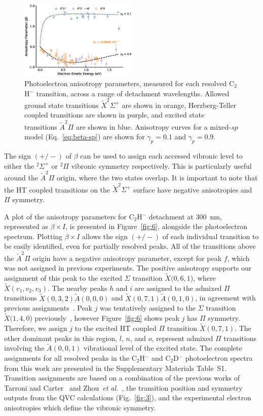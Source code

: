 \documentclass[aip,graphicx]{revtex4-1}
\begin{document}
\begin{figure}[th!]
	\includegraphics[width=0.5\textwidth]{figures/Fig5}
	\caption{Photoelectron anisotropy parameters, measured for each resolved C$_2$H$^-$ transition, across a range of detachment wavelengths. Allowed ground state transitions $\tilde{X}^2\Sigma^+$ are shown in orange, Herzberg-Teller coupled transitions are shown in purple, and excited state transitions $\tilde{A} ^2\Pi$ are shown in blue. Anisotropy curves for a mixed-$sp$ model (Eq.~\ref{eq:beta-sp}) are shown for $\gamma_p=0.1$ and $\gamma_p=0.9$.}
	\label{fig:5}
\end{figure}

The sign $(+/-)$ of $\beta$ can be used to assign each accessed vibronic level to either the $^2\Sigma^+$ or $^2\Pi$ vibronic symmetry respectively. This is particularly useful around the $\tilde{A} ^2\Pi$ origin, where the two states overlap. It is important to note that the HT coupled transitions on the $\tilde{X} ^2\Sigma^+$ surface have negative anisotropies and $\Pi$ symmetry. 

A plot of the anisotropy parameters for C$_2$H$^-$ detachment at 300~nm, represented as $\beta\times I$, is presented in Figure~\ref{fig:6}, alongside the photoelectron spectrum. Plotting $\beta\times I$ allows the sign $(+/-)$ of each individual transition to be easily identified, even for partially resolved peaks. All of the transitions above the $\tilde{A} ^2\Pi$ origin have a negative anisotropy parameter, except for peak $f$, which was not assigned in previous experiments. The positive anisotropy supports our assignment of this peak to the excited $\Sigma$ transition $\tilde{X}(0,6,1$), where $\tilde{X}(v_1,v_2,v_3)$. The nearby peaks $h$ and $i$  are assigned to the admixed $\Pi$ transitions $\tilde{X}(0,3,2)\tilde{A}(0,0,0)$ and $\tilde{X}(0,7,1)\tilde{A}(0,1,0)$, in agreement with previous assignments~\cite{zho07,tar03}. Peak $j$ was tentatively assigned to the $\Sigma$ transition $\tilde{X}(1,4,0$) previously~\cite{zho07}, however Figure~\ref{fig:6} shows peak $j$ has $\Pi$ symmetry. Therefore, we assign $j$ to the excited HT coupled $\Pi$ transition $\tilde{X}(0,7,1)$. The other dominant peaks in this region, $l$, $n$, and $o$, represent admixed $\Pi$ transitions involving the $\tilde{A}(0,0,1)$ vibrational level of the excited state. The complete assignments for all resolved peaks in the C$_2$H$^-$ and C$_2$D$^-$ photoelectron spectra from this work are presented in the Supplementary Materials Table~S1. Transition assignments are based on a combination of the previous works of Tarroni and Carter~\cite{tar03} and Zhou~\emph{et al.}~\cite{zho07}, the transition position and symmetry outputs from the QVC calculations (Fig.~\ref{fig:3}), and the experimental electron anisotropies which define the vibronic symmetry.
\end{document}
